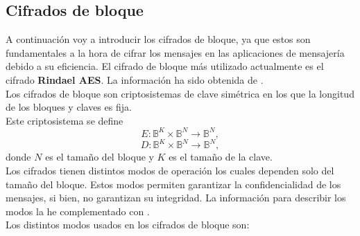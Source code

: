 \subsection{Cifrados de bloque}
A continuación voy a introducir los cifrados de bloque, ya que estos son fundamentales a la hora de cifrar los mensajes en las aplicaciones de mensajería debido a su eficiencia. El cifrado de bloque más utilizado actualmente es el cifrado \textbf{Rindael AES}. La información ha sido obtenida de \cite{apuntesCriptografia}.\\
Los cifrados de bloque son criptosistemas de clave simétrica en los que la longitud de los bloques y claves es fija.\\
Este criptosistema se define
$$
	E:\mathbb{B}^K\times\mathbb{B}^N\rightarrow \mathbb{B}^N,
$$
$$
	D:\mathbb{B}^K\times\mathbb{B}^N\rightarrow \mathbb{B}^N,
$$
donde $N$ es el tamaño del bloque y $K$ es el tamaño de la clave.\\
Los cifrados tienen distintos modos de operación los cuales dependen solo del tamaño del bloque. Estos modos permiten garantizar la confidencialidad de los mensajes, si bien, no garantizan su integridad. La información para describir los modos la he complementado con \cite{bloquenuevo}.\\ 
Los distintos modos usados en los cifrados de bloque son:\\
